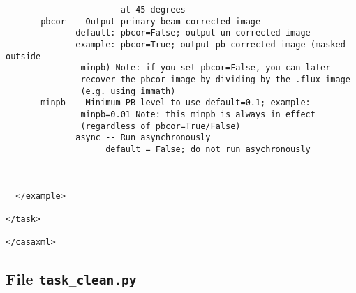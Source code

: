 \begin{verbatim}
                       at 45 degrees
       pbcor -- Output primary beam-corrected image 
              default: pbcor=False; output un-corrected image 
              example: pbcor=True; output pb-corrected image (masked outside
               minpb) Note: if you set pbcor=False, you can later
               recover the pbcor image by dividing by the .flux image
               (e.g. using immath)
       minpb -- Minimum PB level to use default=0.1; example:
               minpb=0.01 Note: this minpb is always in effect
               (regardless of pbcor=True/False) 
              async -- Run asynchronously 
                    default = False; do not run asychronously



  </example>

</task>

</casaxml>
\end{verbatim}


\subsection{File {\tt task\_clean.py} }
\label{section:write.clean.py}

